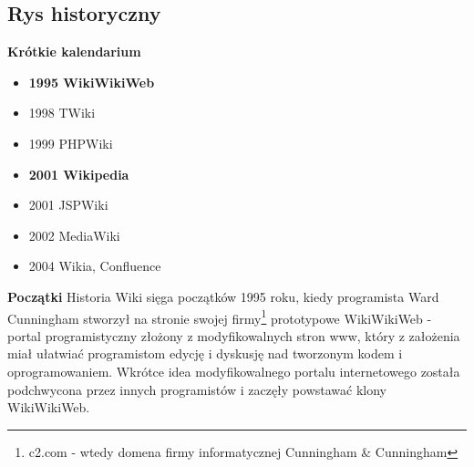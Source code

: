 \documentclass{article}
\begin{document}
	\subsection{Rys historyczny}

	\textbf{Krótkie kalendarium}
	\begin{itemize}
		\item \textbf{1995 WikiWikiWeb}
		\item 1998 TWiki
		\item 1999 PHPWiki
		\item \textbf{2001 Wikipedia}
		\item 2001 JSPWiki
		\item 2002 MediaWiki
		\item 2004 Wikia, Confluence
	\end{itemize}
	\textbf{Początki}
	\newline
	Historia Wiki sięga początków 1995 roku, kiedy programista Ward Cunningham stworzył na stronie swojej firmy\footnote{c2.com - wtedy domena firmy informatycznej Cunningham \& Cunningham} prototypowe WikiWikiWeb - portal programistyczny złożony z modyfikowalnych stron www, który z założenia miał ułatwiać programistom edycję i dyskusję nad tworzonym kodem i oprogramowaniem. Wkrótce idea modyfikowalnego portalu internetowego została podchwycona przez innych programistów i zaczęły powstawać klony WikiWikiWeb. 
	
\end{document}
